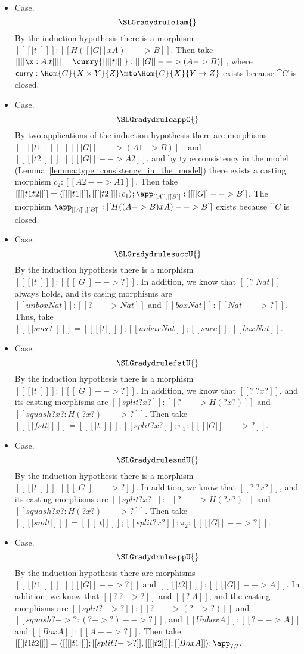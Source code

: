 \begin{itemize}
\item[] Case.
  \[
  \SLGradydrulelam{}
  \] 
  By the induction hypothesis there is a morphism $[[ [| t |] ]] :
  [[ H([| G |] x A) --> B]]$.  Then take $[[ [| \x : A.t |] ]] =
  \curry {[[ [| t |] ]]} : [[ [| G |] --> (A -> B)]]$, where
  $\mathsf{curry} : \Hom{C}{X \times Y}{Z} \mto \Hom{C}{X}{Y \to Z}$
  exists because $\cat{C}$ is closed.

\item[] Case.
  \[
  \SLGradydruleappC{}
  \]
  By two applications of the induction hypothesis there are
  morphisms $[[ [| t1 |] ]] : [[ [| G |] --> (A1 -> B)]]$ and $[[ [|
        t2 |] ]] : [[ [| G |] --> A2]]$, and by type consistency in the model
  (Lemma~\ref{lemma:type_consistency_in_the_model}) there exists a
  casting morphism $c_2 : [[A2 --> A1]]$.
  Then take $[[ [| t1 t2 |] ]] = \langle [[ [| t1 |] ]] , [[ [| t2 |] ]];c_1 \rangle ; \app_{[[A]],[[B]]} : [[ [| G |] --> B]]$.
  The morphism $\app_{[[A]],[[B]]} : [[ H((A -> B) x A) --> B]]$ exists because $\cat{C}$ is closed.
  
\item[] Case.
  \[
  \SLGradydrulesuccU{}
  \]
  By the induction hypothesis there is a morphism $[[ [| t |] ]] :
  [[ [| G |] --> ?]]$.  In addition, we know that $[[? ~ Nat]]$
  always holds, and its casing morphisms are $[[unbox Nat]] : [[? -->
      Nat]]$ and $[[box Nat]] : [[Nat --> ?]]$.
  Thus, take $[[ [| succ t |] ]] = [[ [| t |] ]];[[unbox Nat]];[[succ]];[[box Nat]]$.

\item[] Case.
  \[
  \SLGradydrulefstU{}
  \]
  By the induction hypothesis there is a morphism $[[ [| t |] ]] :
  [[ [| G |] --> ?]]$.  In addition, we know that $[[? ~ ? x ?]]$, and its casting morphisms are
  $[[split ? x ?]] : [[? --> H(? x ?)]]$ and $[[squash ? x ? : H(? x ?) --> ?]]$.
  Then take $[[ [| fst t |] ]] = [[ [| t |] ]];[[split ? x ?]];\pi_1 : [[ [| G |] --> ?]]$.
  
\item[] Case.
  \[
  \SLGradydrulesndU{}
  \]
  By the induction hypothesis there is a morphism $[[ [| t |] ]] :
  [[ [| G |] --> ?]]$.  In addition, we know that $[[? ~ ? x ?]]$, and its casting morphisms are
  $[[split ? x ?]] : [[? --> H(? x ?)]]$ and $[[squash ? x ? : H(? x ?) --> ?]]$.
  Then take $[[ [| snd t |] ]] = [[ [| t |] ]];[[split ? x ?]];\pi_2 : [[ [| G |] --> ?]]$.    
  
\item[] Case.
  \[
  \SLGradydruleappU{}
  \]
  By the induction hypothesis there are morphisms $[[ [| t1 |] ]] : [[ [| G |] --> ?]]$
  and $[[ [| t2 |] ]] : [[ [| G |] --> A]]$.  In addition, we know that $[[? ~ ? -> ?]]$ and $[[? ~ A]]$, and the
  casting morphisms are
  $[[split ? -> ?]] : [[? --> (? -> ?)]]$ and $[[squash ? -> ? : (? -> ?) --> ?]]$, and
  $[[Unbox A]] : [[? --> A]]$ and $[[Box A]] : [[A --> ?]]$.  
  Then take $[[ [| t1 t2 |] ]] = \langle [[ [| t1 |] ]];[[split ? -> ?]] , [[ [| t2 |] ]];[[Box A]] \rangle;\app_{?,?}$.
\end{itemize}

